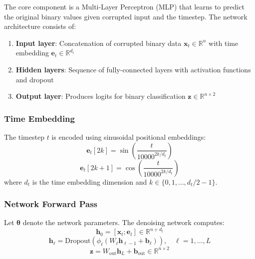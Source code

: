 \documentclass[11pt,a4paper]{article}
\newcommand{\R}{\mathbb{R}}
\newcommand{\vx}{\mathbf{x}}
\newcommand{\vtheta}{\boldsymbol{\theta}}
\begin{document}
The core component is a Multi-Layer Perceptron (MLP) that learns to predict the original binary values given corrupted input and the timestep. The network architecture consists of:

\begin{enumerate}
    \item \textbf{Input layer}: Concatenation of corrupted binary data $\vx_t \in \R^n$ with time embedding $\mathbf{e}_t \in \R^{d_t}$
    \item \textbf{Hidden layers}: Sequence of fully-connected layers with activation functions and dropout
    \item \textbf{Output layer}: Produces logits for binary classification $\mathbf{z} \in \R^{n \times 2}$
\end{enumerate}

\subsubsection{Time Embedding}

The timestep $t$ is encoded using sinusoidal positional embeddings:
\begin{equation}
    \mathbf{e}_t[2k] = \sin\left(\frac{t}{10000^{2k/d_t}}\right)
\end{equation}
\begin{equation}
    \mathbf{e}_t[2k+1] = \cos\left(\frac{t}{10000^{2k/d_t}}\right)
\end{equation}
where $d_t$ is the time embedding dimension and $k \in \{0, 1, \ldots, d_t/2 - 1\}$.

\subsubsection{Network Forward Pass}

Let $\vtheta$ denote the network parameters. The denoising network computes:
\begin{equation}
    \mathbf{h}_0 = [\vx_t; \mathbf{e}_t] \in \R^{n + d_t}
\end{equation}
\begin{equation}
    \mathbf{h}_\ell = \text{Dropout}\left(\phi_\ell\left(W_\ell \mathbf{h}_{\ell-1} + \mathbf{b}_\ell\right)\right), \quad \ell = 1, \ldots, L
\end{equation}
\begin{equation}
    \mathbf{z} = W_{\text{out}} \mathbf{h}_L + \mathbf{b}_{\text{out}} \in \R^{n \times 2}
\end{equation}
\end{document}
